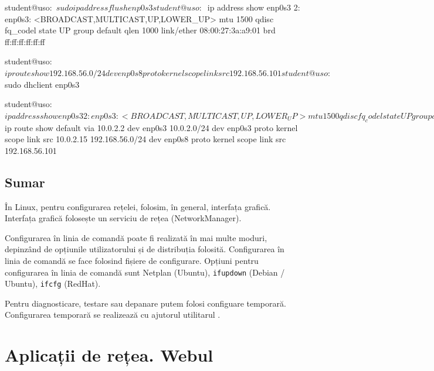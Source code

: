 \begin{screen}[caption={Configurarea automată (prin DHCP) din linia de comandă},label={lst:net:dhclient}]
student@uso:~$ sudo ip address flush enp0s3

student@uso:~$ ip address show enp0s3
2: enp0s3: <BROADCAST,MULTICAST,UP,LOWER_UP> mtu 1500 qdisc fq_codel state UP group default qlen 1000
    link/ether 08:00:27:3a:a9:01 brd ff:ff:ff:ff:ff:ff

student@uso:~$ ip route show
192.168.56.0/24 dev enp0s8 proto kernel scope link src 192.168.56.101 

student@uso:~$ sudo dhclient enp0s3

student@uso:~$ ip address show enp0s3
2: enp0s3: <BROADCAST,MULTICAST,UP,LOWER_UP> mtu 1500 qdisc fq_codel state UP group default qlen 1000
    link/ether 08:00:27:3a:a9:01 brd ff:ff:ff:ff:ff:ff
    inet 10.0.2.15/24 brd 10.0.2.255 scope global enp0s3
       valid_lft forever preferred_lft forever

student@uso:~$ ip route show
default via 10.0.2.2 dev enp0s3
10.0.2.0/24 dev enp0s3 proto kernel scope link src 10.0.2.15
192.168.56.0/24 dev enp0s8 proto kernel scope link src 192.168.56.101
\end{screen}

\subsection{Sumar}
\label{sec:net:linux-config:summary}

În Linux, pentru configurarea rețelei, folosim, în general, interfața grafică.
Interfața grafică folosește un serviciu de rețea (NetworkManager).

Configurarea în linia de comandă poate fi realizată în mai multe moduri, depinzând de opțiunile utilizatorului și de distribuția folosită.
Configurarea în linia de comandă se face folosind fișiere de configurare.
Opțiuni pentru configurarea în linia de comandă sunt Netplan (Ubuntu), \texttt{ifupdown} (Debian / Ubuntu), \texttt{ifcfg} (RedHat).

Pentru diagnosticare, testare sau depanare putem folosi configuare temporară.
Configurarea temporară se realizează cu ajutorul utilitarul .

\section{Aplicații de rețea. Webul}
\label{sec:net:apps}


